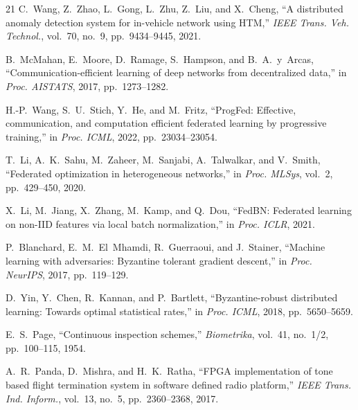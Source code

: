 \documentclass[conference]{IEEEtran}
\begin{document}
\begin{thebibliography}{21}
C.~Wang, Z.~Zhao, L.~Gong, L.~Zhu, Z.~Liu, and X.~Cheng, ``A distributed anomaly detection system for in-vehicle network using HTM,'' \textit{IEEE Trans. Veh. Technol.}, vol.~70, no.~9, pp.~9434--9445, 2021.

B.~McMahan, E.~Moore, D.~Ramage, S.~Hampson, and B.~A.~y~Arcas, ``Communication-efficient learning of deep networks from decentralized data,'' in \textit{Proc. AISTATS}, 2017, pp.~1273--1282.

H.-P.~Wang, S.~U.~Stich, Y.~He, and M.~Fritz, ``ProgFed: Effective, communication, and computation efficient federated learning by progressive training,'' in \textit{Proc. ICML}, 2022, pp.~23034--23054.

T.~Li, A.~K.~Sahu, M.~Zaheer, M.~Sanjabi, A.~Talwalkar, and V.~Smith, ``Federated optimization in heterogeneous networks,'' in \textit{Proc. MLSys}, vol.~2, pp.~429--450, 2020.

X.~Li, M.~Jiang, X.~Zhang, M.~Kamp, and Q.~Dou, ``FedBN: Federated learning on non-IID features via local batch normalization,'' in \textit{Proc. ICLR}, 2021.

P.~Blanchard, E.~M.~El~Mhamdi, R.~Guerraoui, and J.~Stainer, ``Machine learning with adversaries: Byzantine tolerant gradient descent,'' in \textit{Proc. NeurIPS}, 2017, pp.~119--129.

D.~Yin, Y.~Chen, R.~Kannan, and P.~Bartlett, ``Byzantine-robust distributed learning: Towards optimal statistical rates,'' in \textit{Proc. ICML}, 2018, pp.~5650--5659.

E.~S.~Page, ``Continuous inspection schemes,'' \textit{Biometrika}, vol.~41, no.~1/2, pp.~100--115, 1954.

A.~R.~Panda, D.~Mishra, and H.~K.~Ratha, ``FPGA implementation of tone based flight termination system in software defined radio platform,'' \textit{IEEE Trans. Ind. Inform.}, vol.~13, no.~5, pp.~2360--2368, 2017.

\end{thebibliography}
\end{document}
